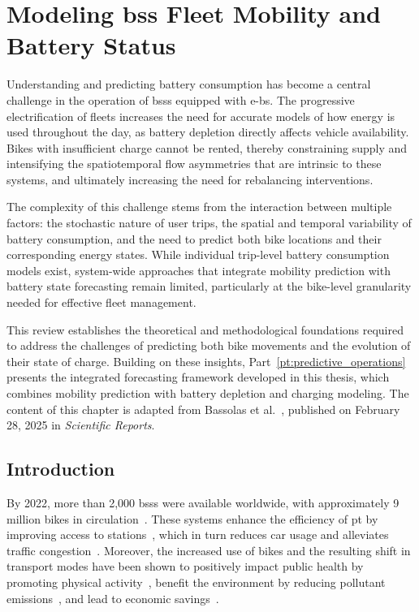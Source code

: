 \chapter[Modeling BSS Fleet Mobility and Battery Status]{Modeling \ac{bss} Fleet Mobility and Battery Status}
\label{ch:mobility_and_battery_modeling}

Understanding and predicting battery consumption has become a central challenge in the operation of \acp{bss} equipped with \acp{e-b}. The progressive electrification of fleets increases the need for accurate models of how energy is used throughout the day, as battery depletion directly affects vehicle availability. Bikes with insufficient charge cannot be rented, thereby constraining supply and intensifying the spatiotemporal flow asymmetries that are intrinsic to these systems, and ultimately increasing the need for rebalancing interventions.

The complexity of this challenge stems from the interaction between multiple factors: the stochastic nature of user trips, the spatial and temporal variability of battery consumption, and the need to predict both bike locations and their corresponding energy states. While individual trip-level battery consumption models exist, system-wide approaches that integrate mobility prediction with battery state forecasting remain limited, particularly at the bike-level granularity needed for effective fleet management.

This review establishes the theoretical and methodological foundations required to address the challenges of predicting both bike movements and the evolution of their state of charge. Building on these insights, Part~\ref{pt:predictive_operations} presents the integrated forecasting framework developed in this thesis, which combines mobility prediction with battery depletion and charging modeling. The content of this chapter is adapted from Bassolas et al.~\cite{Bassolas2025}, published on February 28, 2025 in \textit{Scientific Reports}.


\section{Introduction}

By 2022, more than 2,000 \acp{bss} were available worldwide, with approximately 9 million bikes in circulation~\cite{MeddinWorldMap2025}. These systems enhance the efficiency of \ac{pt} by improving access to stations~\cite{Noland2019, Kapuku2021}, which in turn reduces car usage and alleviates traffic congestion~\cite{Ma2020, Fan2020}. Moreover, the increased use of bikes and the resulting shift in transport modes have been shown to positively impact public health by promoting physical activity~\cite{Otero2018}, benefit the environment by reducing pollutant emissions~\cite{Clockston2021}, and lead to economic savings~\cite{Ricci2015}.

